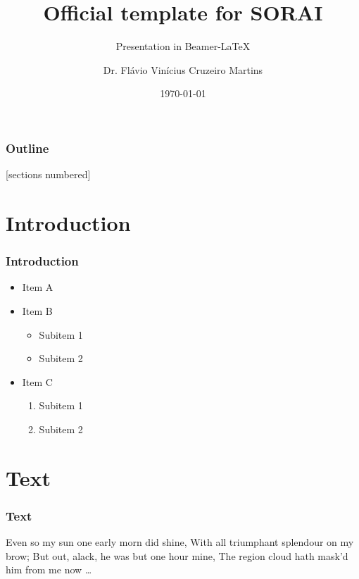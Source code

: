 \documentclass[aspectratio=169]{beamer}
\title{Official template for SORAI}
\subtitle{Presentation in Beamer-\LaTeX}
\author{Dr. Flávio Vinícius Cruzeiro Martins}
\date{\today}
\institute{\url{flaviocruzeiro@cefetmg.br}}
\numberwithin{figure}{section}
\numberwithin{equation}{section}
\begin{document}

\begin{frame}[plain,t]
\titlepage
\end{frame}


\begin{frame}
  \addtocounter{framenumber}{-1}
  \scriptsize
  \frametitle{Outline}
  [sections numbered]
  \tableofcontents[hideallsubsections]
\end{frame}


\section{Introduction}
\begin{frame}
 \frametitle{Introduction}
 \begin{itemize}
  \item Item A
  \item Item B
  
  \begin{itemize}
   \item Subitem 1
   \item Subitem 2
  \end{itemize}
  
  \item Item C
  \begin{enumerate}
   \item Subitem 1
   \item Subitem 2
  \end{enumerate}
 \end{itemize}
\end{frame}


\section{Text}
\begin{frame}
 \frametitle{Text}
 Even so my sun one early morn did shine,
With all triumphant splendour on my brow;
But out, alack, he was but one hour mine,
The region cloud hath mask’d him from me now … \\~\\
\end{frame}
\end{document}
